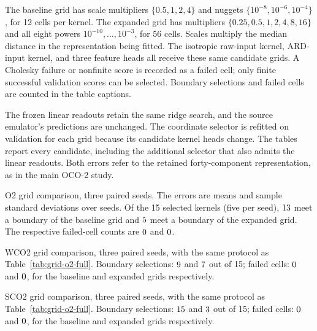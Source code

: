 The baseline grid has scale multipliers $\{0.5,1,2,4\}$ and nuggets
$\{10^{-8},10^{-6},10^{-4}\}$, for 12 cells per kernel. The expanded grid
has multipliers $\{0.25,0.5,1,2,4,8,16\}$ and all eight powers
$10^{-10},\ldots,10^{-3}$, for 56 cells. Scales multiply the median
distance in the representation being fitted. The isotropic raw-input
kernel, ARD-input kernel, and three feature heads all receive these same
candidate grids. A Cholesky failure or nonfinite score is recorded as a
failed cell; only finite successful validation scores can be selected.
Boundary selections and failed cells are counted in the table captions.

The frozen linear readouts retain the same ridge search, and the
source emulator's predictions are unchanged. The coordinate selector is
refitted on validation for each grid because its candidate kernel heads
change. The tables report every candidate, including the additional
selector that also admits the linear readouts. Both errors refer to the
retained forty-component representation, as in the main OCO-2 study.

\begin{table}[t]
\centering
\caption{O2 grid comparison, three paired seeds. The errors are means and
sample standard deviations over seeds. Of the 15 selected kernels (five
per seed), $\sensOtwoOldBoundary$ meet a boundary of the baseline grid and
$\sensOtwoNewBoundary$ meet a boundary of the expanded grid. The respective
failed-cell counts are $\sensOtwoOldFailed$ and $\sensOtwoNewFailed$.}
\label{tab:grid-o2-full}
\begin{adjustbox}{max width=\linewidth}

\end{adjustbox}
\end{table}

\begin{table}[t]
\centering
\caption{WCO2 grid comparison, three paired seeds, with the same protocol
as Table~\ref{tab:grid-o2-full}. Boundary selections: $\sensWcoOldBoundary$
and $\sensWcoNewBoundary$ out of 15; failed cells: $\sensWcoOldFailed$ and
$\sensWcoNewFailed$, for the baseline and expanded grids respectively.}
\label{tab:grid-wco2-full}
\begin{adjustbox}{max width=\linewidth}

\end{adjustbox}
\end{table}

\begin{table}[t]
\centering
\caption{SCO2 grid comparison, three paired seeds, with the same protocol
as Table~\ref{tab:grid-o2-full}. Boundary selections: $\sensScoOldBoundary$
and $\sensScoNewBoundary$ out of 15; failed cells: $\sensScoOldFailed$ and
$\sensScoNewFailed$, for the baseline and expanded grids respectively.}
\label{tab:grid-sco2-full}
\begin{adjustbox}{max width=\linewidth}

\end{adjustbox}
\end{table}

